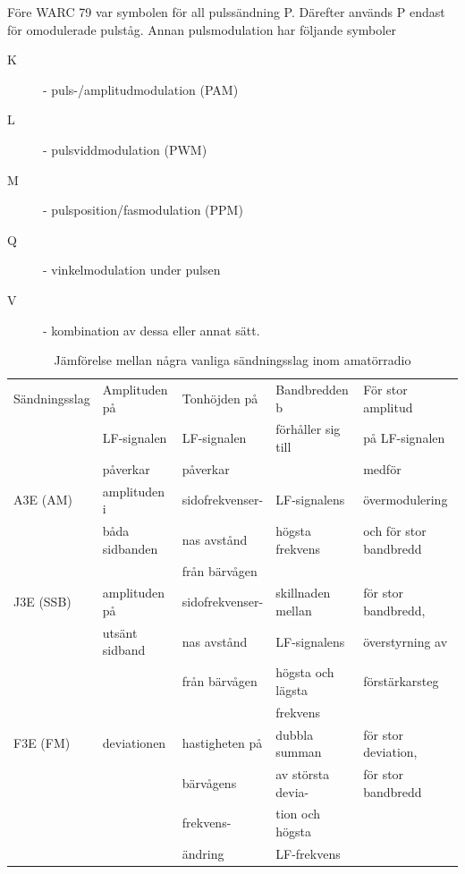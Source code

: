 Före WARC 79 var symbolen för all pulssändning P. Därefter används P endast för
omodulerade pulståg. Annan pulsmodulation har följande symboler

\begin{description}
\item[K] - puls-/amplitudmodulation (PAM)
\item[L] - pulsviddmodulation (PWM)
\item[M] - pulsposition/fasmodulation (PPM)
\item[Q] - vinkelmodulation under pulsen
\item[V] - kombination av dessa eller annat sätt.
\end{description}

\begin{table}[h]
\begin{center}
\begin{tabular}{|l|l|l|l|l|}
\hline
Sändningsslag & Amplituden på & Tonhöjden på & Bandbredden b      & För stor amplitud \\
              & LF-signalen   & LF-signalen  & förhåller sig till & på LF-signalen \\
              & påverkar      & påverkar     &                    & medför \\ \hline
A3E (AM) & amplituden i   & sidofrekvenser- & LF-signalens    & övermodulering \\
         & båda sidbanden & nas avstånd    & högsta frekvens & och för stor bandbredd \\
         &                & från bärvågen  & & \\
J3E (SSB)& amplituden på  & sidofrekvenser- & skillnaden mellan & för stor bandbredd,\\
         & utsänt sidband & nas avstånd    & LF-signalens      & överstyrning av\\
         &                & från bärvågen  & högsta och lägsta & förstärkarsteg\\
         &                &                & frekvens          & \\
F3E (FM) & deviationen    & hastigheten på & dubbla summan     & för stor deviation,\\
         &                & bärvågens      & av största devia- & för stor bandbredd\\
         &                & frekvens-      & tion och högsta   & \\
         &                & ändring        & LF-frekvens       & \\ \hline
\end{tabular}
\end{center}
\caption{Jämförelse mellan några vanliga sändningsslag inom amatörradio}
\end{table}

